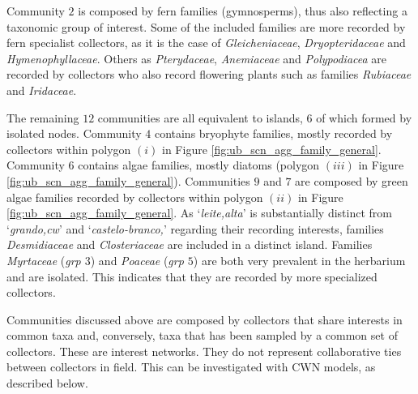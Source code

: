 Community $2$ is composed by fern families (gymnosperms), thus also reflecting a taxonomic group of interest.
Some of the included families are more recorded by fern specialist collectors, as it is the case of \textit{Gleicheniaceae}, \textit{Dryopteridaceae} and \textit{Hymenophyllaceae}.
Others as \textit{Pterydaceae}, \textit{Anemiaceae} and \textit{Polypodiacea} are recorded by collectors who also record flowering plants such as families \textit{Rubiaceae} and \textit{Iridaceae}.


The remaining $12$ communities are all equivalent to islands, $6$ of which formed by isolated nodes.
%
Community $4$ contains bryophyte families, mostly recorded by collectors within polygon $(i)$ in Figure \ref{fig:ub_scn_agg_family_general}.
%
Community $6$ contains algae families, mostly diatoms (polygon $(iii)$ in Figure \ref{fig:ub_scn_agg_family_general}).
%
Communities $9$ and $7$ are composed by green algae families recorded by collectors within polygon $(ii)$ in Figure \ref{fig:ub_scn_agg_family_general}.
As `\textit{leite,alta}' is substantially distinct from `\textit{grando,cw}' and `\textit{castelo-branco,}' regarding their recording interests, families \textit{Desmidiaceae} and \textit{Closteriaceae} are included in a distinct island.
%
Families \textit{Myrtaceae} (\textit{grp $3$}) and \textit{Poaceae} (\textit{grp $5$}) are both very prevalent in the herbarium and are isolated.
This indicates that they are recorded by more specialized collectors.







Communities discussed above are composed by collectors that share interests in common taxa and, conversely, taxa that has been sampled by a common set of collectors.
These are interest networks.
They do not represent collaborative ties between collectors in field.
This can be investigated with CWN models, as described below.



